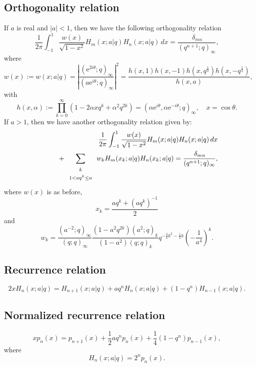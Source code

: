 \documentclass[envcountchap,graybox]{svmono}
\newcommand{\mathindent}{\hspace{7.5mm}}
\newcommand{\e}{\textrm{e}}
\begin{document}
\subsection*{Orthogonality relation}
If $a$ is real and $|a|<1$, then we have the following orthogonality relation
\begin{equation}
\label{OrtContBigqHermite1}
\frac{1}{2\pi}\int_{-1}^1\frac{w(x)}{\sqrt{1-x^2}}H_m(x;a|q)H_n(x;a|q)\,dx
=\frac{\,\delta_{mn}}{(q^{n+1};q)_{\infty}},
\end{equation}
where
$$w(x):=w(x;a|q)=\left|\frac{(\e^{2i\theta};q)_{\infty}}
{(a\e^{i\theta};q)_{\infty}}\right|^2=
\frac{h(x,1)h(x,-1)h(x,q^{\frac{1}{2}})h(x,-q^{\frac{1}{2}})}{h(x,a)},$$
with
$$h(x,\alpha):=\prod_{k=0}^{\infty}\left(1-2\alpha xq^k+\alpha^2q^{2k}\right)
=\left(\alpha\e^{i\theta},\alpha\e^{-i\theta};q\right)_{\infty},\quad x=\cos\theta.$$
If $a>1$, then we have another orthogonality relation given by:
\begin{eqnarray}
\label{OrtContBigqHermite2}
& &\frac{1}{2\pi}\int_{-1}^1\frac{w(x)}{\sqrt{1-x^2}}H_m(x;a|q)H_n(x;a|q)\,dx\nonumber\\
& &{}\mathindent{}+\sum_{\begin{array}{c}\scriptstyle k\\ \scriptstyle 1<aq^k\leq a\end{array}}
w_kH_m(x_k;a|q)H_n(x_k;a|q)=\frac{\,\delta_{mn}}{(q^{n+1};q)_{\infty}},
\end{eqnarray}
where $w(x)$ is as before,
$$x_k=\frac{aq^k+\left(aq^k\right)^{-1}}{2}$$
and
$$w_k=\frac{(a^{-2};q)_{\infty}}{(q;q)_{\infty}}
\frac{(1-a^2q^{2k})(a^2;q)_k}{(1-a^2)(q;q)_k}
q^{-\frac{3}{2}k^2-\frac{1}{2}k}\left(-\frac{1}{a^4}\right)^k.$$

\subsection*{Recurrence relation}
\begin{equation}
\label{RecContBigqHermite}
2xH_n(x;a|q)=H_{n+1}(x;a|q)+aq^nH_n(x;a|q)+(1-q^n)H_{n-1}(x;a|q).
\end{equation}

\subsection*{Normalized recurrence relation}
\begin{equation}
\label{NormRecContBigqHermite}
xp_n(x)=p_{n+1}(x)+\frac{1}{2}aq^np_n(x)+\frac{1}{4}(1-q^n)p_{n-1}(x),
\end{equation}
where
$$H_n(x;a|q)=2^np_n(x).$$
\end{document}
